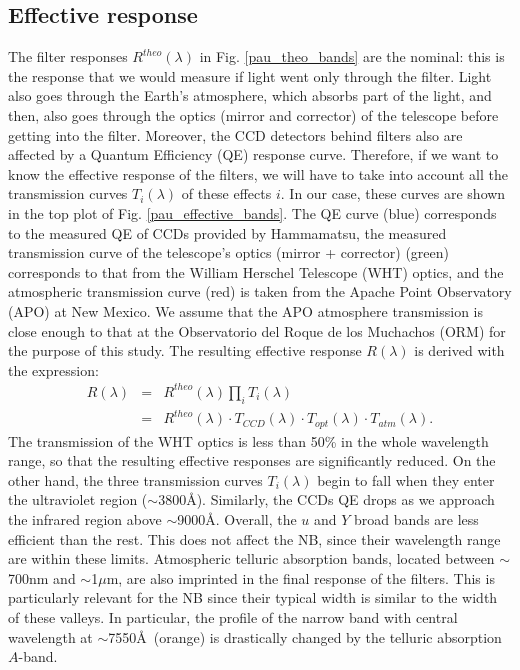 \subsection{Effective response}
The filter responses $R^{theo}(\lambda)$ in Fig. \ref{pau_theo_bands} are the nominal: this is the response that we would measure if light went only through the filter. Light also goes through the Earth's atmosphere, which absorbs part of the light, and then, also goes through the optics (mirror and corrector) of the telescope before getting into the filter. Moreover, the CCD detectors behind filters also are affected by a Quantum Efficiency (QE) response curve. Therefore, if we want to know the effective response of the filters, we will have to take into account all the transmission curves $T_i(\lambda)$ of these effects $i$. In our case, these curves are shown in the top plot of Fig. \ref{pau_effective_bands}. The QE curve (blue) corresponds to the measured QE of CCDs provided by Hammamatsu, the measured transmission curve of the telescope's optics (mirror + corrector) (green) corresponds to that from the William Herschel Telescope (WHT) optics, and the atmospheric transmission curve (red) is taken from the Apache Point Observatory (APO) at New Mexico. We assume that the APO atmosphere transmission is close enough to that at the Observatorio del Roque de los Muchachos (ORM) for the purpose of this study. The resulting effective response $R(\lambda)$ is derived with the expression:
\begin{eqnarray}
R(\lambda) &=& R^{theo}(\lambda) \prod_{i} T_i(\lambda) \nonumber \\
&=& R^{theo}(\lambda) \cdot T_{CCD}(\lambda) \cdot T_{opt}(\lambda) \cdot T_{atm}(\lambda).
\label{eff_filt}
\end{eqnarray}
The transmission of the WHT optics is less than 50\% in the whole wavelength range, so that the resulting effective responses are significantly reduced. On the other hand, the three transmission curves $T_i(\lambda)$ begin to fall when they enter the ultraviolet region ($\sim$3800\AA). Similarly, the CCDs QE drops as we approach the infrared region above $\sim$9000\AA. Overall, the $u$ and $Y$ broad bands are less efficient than the rest. This does not affect the NB, since their wavelength range are within these limits. Atmospheric telluric absorption bands, located between $\sim$700nm and $\sim$1$\mu$m, are also imprinted in the final response of the filters. This is particularly relevant for the NB since their typical width is similar to the width of these valleys. In particular, the profile of the narrow band with central wavelength at $\sim$7550\AA \ (orange) is drastically changed by the telluric absorption $A$-band. 
